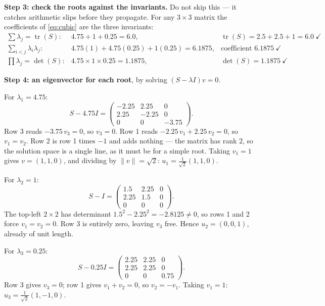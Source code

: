 \documentclass[11pt]{article}
\begin{document}
\begin{worked}
\medskip
\textbf{Step 3: check the roots against the invariants.} Do not skip this ---
it catches arithmetic slips before they propagate. For any $3\times3$ matrix
the coefficients of \eqref{eq:cubic} are the three invariants:
\[
  \begin{array}{lll}
    \sum\lambda_j = \operatorname{tr}(S) : & 4.75 + 1 + 0.25 = 6.0, &
      \operatorname{tr}(S) = 2.5+2.5+1 = 6.0 \ \checkmark\\[2pt]
    \sum_{i<j}\lambda_i\lambda_j : & 4.75(1) + 4.75(0.25) + 1(0.25) = 6.1875,
      & \text{coefficient } 6.1875 \ \checkmark\\[2pt]
    \prod\lambda_j = \det(S) : & 4.75 \times 1 \times 0.25 = 1.1875, &
      \det(S) = 1.1875 \ \checkmark
  \end{array}
\]

\medskip
\textbf{Step 4: an eigenvector for each root}, by solving
$(S - \lambda I)v = 0$.

For $\lambda_1 = 4.75$:
\[
  S - 4.75I = \begin{pmatrix}
    -2.25 & 2.25 & 0\\ 2.25 & -2.25 & 0\\ 0 & 0 & -3.75
  \end{pmatrix}.
\]
Row 3 reads $-3.75\,v_3 = 0$, so $v_3 = 0$. Row 1 reads
$-2.25\,v_1 + 2.25\,v_2 = 0$, so $v_1 = v_2$. Row 2 is row 1 times $-1$ and
adds nothing --- the matrix has rank 2, so the solution space is a single
line, as it must be for a simple root. Taking $v_1 = 1$ gives $v = (1,1,0)$,
and dividing by $\lVert v\rVert = \sqrt2$:
$u_1 = \frac{1}{\sqrt2}(1,1,0)$.

For $\lambda_2 = 1$:
\[
  S - I = \begin{pmatrix}
    1.5 & 2.25 & 0\\ 2.25 & 1.5 & 0\\ 0 & 0 & 0
  \end{pmatrix}.
\]
The top-left $2\times2$ has determinant $1.5^2 - 2.25^2 = -2.8125 \neq 0$, so
rows 1 and 2 force $v_1 = v_2 = 0$. Row 3 is entirely zero, leaving $v_3$
free. Hence $u_2 = (0,0,1)$, already of unit length.

For $\lambda_3 = 0.25$:
\[
  S - 0.25I = \begin{pmatrix}
    2.25 & 2.25 & 0\\ 2.25 & 2.25 & 0\\ 0 & 0 & 0.75
  \end{pmatrix}.
\]
Row 3 gives $v_3 = 0$; row 1 gives $v_1 + v_2 = 0$, so $v_2 = -v_1$. Taking
$v_1 = 1$: $u_3 = \frac{1}{\sqrt2}(1,-1,0)$.


\end{worked}
\end{document}
